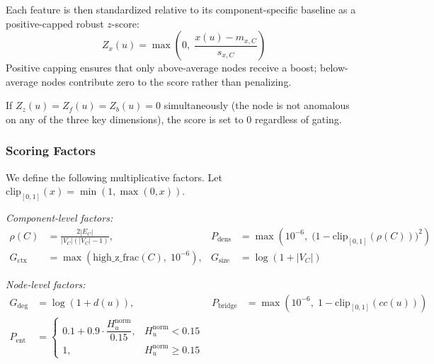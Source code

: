 \documentclass[11pt]{article}
\begin{document}
Each feature is then standardized relative to its component-specific baseline as a positive-capped robust $z$-score:
\begin{equation}
Z_x(u) = \max\!\left(0,\; \frac{x(u) - m_{x,C}}{s_{x,C}}\right)
\end{equation}
Positive capping ensures that only above-average nodes receive a boost; below-average nodes contribute zero to the score rather than penalizing.

If $Z_z(u) = Z_f(u) = Z_b(u) = 0$ simultaneously (the node is not anomalous on any of the three key dimensions), the score is set to 0 regardless of gating.

\subsubsection{Scoring Factors}

We define the following multiplicative factors. Let $\mathrm{clip}_{[0,1]}(x) = \min(1,\max(0,x))$.

\medskip\noindent\textit{Component-level factors:}
\begin{align}
\rho(C) &= \frac{2|E_C|}{|V_C|(|V_C|-1)}, &
P_{\mathrm{dens}} &= \max\!\left(10^{-6},\; \bigl(1 - \mathrm{clip}_{[0,1]}(\rho(C))\bigr)^2\right) \\
G_{\mathrm{ctx}} &= \max\!\left(\mathrm{high\_z\_frac}(C),\; 10^{-6}\right), &
G_{\mathrm{size}} &= \log(1 + |V_C|)
\end{align}

\medskip\noindent\textit{Node-level factors:}
\begin{align}
G_{\mathrm{deg}} &= \log(1 + d(u)), &
P_{\mathrm{bridge}} &= \max\!\left(10^{-6},\; 1 - \mathrm{clip}_{[0,1]}(cc(u))\right) \\
P_{\mathrm{ent}} &= \begin{cases}
0.1 + 0.9 \cdot \dfrac{H_u^{\mathrm{norm}}}{0.15}, & H_u^{\mathrm{norm}} < 0.15 \\[6pt]
1, & H_u^{\mathrm{norm}} \ge 0.15
\end{cases}
\end{align}
\end{document}
